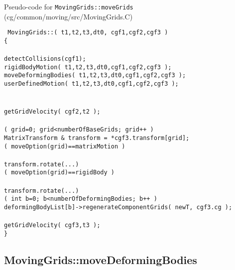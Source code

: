 \documentclass[11pt]{article}
\begin{document}
Pseudo-code for {\tt MovingGrids::moveGrids} (cg/common/moving/src/MovingGrids.C)
\begin{flushleft}\tt
MovingGrids::( t1,t2,t3,dt0, cgf1,cgf2,cgf3 ) \\
\{  \\
\ia  {}  \\
\ia  detectCollisions(cgf1); \\
\ia  rigidBodyMotion( t1,t2,t3,dt0,cgf1,cgf2,cgf3 );\\
\ia  moveDeformingBodies( t1,t2,t3,dt0,cgf1,cgf2,cgf3 );\\
\ia  userDefinedMotion( t1,t2,t3,dt0,cgf1,cgf2,cgf3 );\\
\ia  {} \\
\ia \\
\ia  getGridVelocity( cgf2,t2 ); \\
\ia  {}  \\
\ia  \FOR( grid=0; grid<numberOfBaseGrids; grid++ )  \\
\ib     MatrixTransform \& transform = *cgf3.transform[grid];  \\
\ib     \IF( moveOption(grid)==matrixMotion ) \\
\ic       {}  \\
\ic       transform.rotate(...)  \\
\ib     \ELSEIF( moveOption(grid)==rigidBody ) \\
\ic        {}        \\
\ic       transform.rotate(...)  \\
\ia  \FOR( int b=0; b<numberOfDeformingBodies; b++ ) \\
\ib     deformingBodyList[b]->regenerateComponentGrids(  newT, cgf3.cg );   \\
\ia   \\
\ia  getGridVelocity( cgf3,t3 );  \\
\}
\end{flushleft}

\subsection{MovingGrids::moveDeformingBodies}\label{sec:MovingGrids::moveDeformingBodies}
\end{document}
